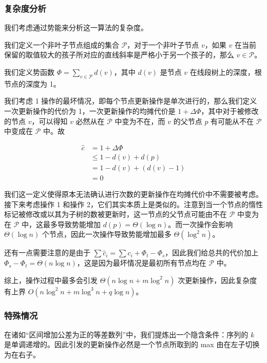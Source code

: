 \documentclass{noithesis}
\begin{document}
\subsubsection{复杂度分析}

我们考虑通过势能来分析这一算法的复杂度。

我们定义一个非叶子节点组成的集合 $\mathcal P$，对于一个非叶子节点 $v$，如果 $v$ 在当前保留的取值较大的孩子所对应的直线斜率是严格小于另一个孩子的，那么 $v\in \mathcal P$。

我们定义势函数 $\Phi = \sum_{v\in \mathcal P} d(v)$，其中 $d(v)$ 是节点 $v$ 在线段树上的深度，根节点的深度为 1。

我们考虑 1 操作的最坏情况，即每个节点更新操作是单次进行的，那么我们定义一次更新操作的代价为 1，一次更新操作的均摊代价是 $1 + \Delta\Phi$，其中对于被修改的节点 $v$，可以得知 $v$ 必然从在 $\mathcal P$ 中变为不在，而 $v$ 的父节点 $p$ 有可能从不在 $\mathcal P$ 中变成在 $\mathcal P$ 中。故

\begin{align*}
\widehat c &= 1 + \Delta \Phi\\
&\le 1 - d(v) + d(p) \\
&= 1 - d(v) + (d(v) - 1)\\
&= 0
\end{align*}

我们这一定义使得原本无法确认进行次数的更新操作在均摊代价中不需要被考虑。接下来考虑操作 1 和操作 2，它们其实本质上是类似的。注意到当一个节点的惰性标记被修改或以其为子树的数被更新时，这一节点的父节点可能由不在 $\mathcal P$ 中变为在 $\mathcal P$ 中，这最多导致势能增加 $d(p) = \Theta(\log n)$。而一次操作会影响 $\Theta(\log n)$ 个节点，因此一次操作导致势能增加最多 $\Theta(\log^2 n)$。

还有一点需要注意的是由于 $\sum \widehat c_i = \sum c_i + \Phi_t - \Phi_s$，因此我们给总共的代价加上 $\Phi_s - \Phi_t = \Theta(n\log n)$，这是因为最坏情况是最初所有节点均在 $\mathcal P$ 中。

综上，操作过程中最多会引发 $\Theta(n\log n + m\log^2 n)$ 次更新操作，因此复杂度有上界 $O(n\log^2 n + m\log^3 n + q\log n)$。

\subsubsection{特殊情况}

在诸如“区间增加公差为正的等差数列”中，我们提炼出一个隐含条件：序列的 $k$ 是单调递增的。因此引发的更新操作必然是一个节点所取到的 max 由在左子切换为在右子。
\end{document}

